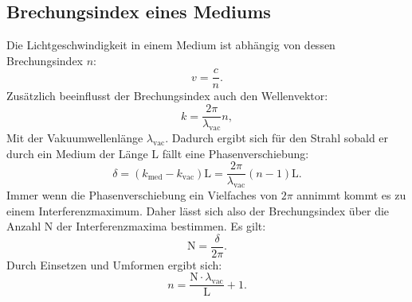 \documentclass[
  bibliography=totoc,     %
  captions=tableheading,  %
  titlepage=firstiscover, %
]{scrartcl}
\begin{document}
\subsection{Brechungsindex eines Mediums}
\label{sub:brechmedium}
Die Lichtgeschwindigkeit in einem Medium ist abhängig von dessen Brechungsindex $n$:
\begin{equation}
  v = \frac{c}{n}.
  \label{eqn:lichtmedium}
\end{equation}
Zusätzlich beeinflusst der Brechungsindex auch den Wellenvektor:
\begin{equation}
  k = \frac{2\pi}{\lambda_\mathup{vac}}n,
  \label{eqn:lichtmedium}
\end{equation}
Mit der Vakuumwellenlänge $\lambda_\mathup{vac}$.
Dadurch ergibt sich für den Strahl sobald er durch ein Medium der Länge $\mathup{L}$
fällt eine Phasenverschiebung:
\begin{equation}
  \delta = (k_\mathup{med}-k_\mathup{vac})\mathup{L} = \frac{2\pi}{\lambda_\mathup{vac}}(n-1)\mathup{L}.
  \label{eqn:phasen}
\end{equation}
Immer wenn die Phasenverschiebung ein Vielfaches von $2\pi$ annimmt kommt es zu
einem Interferenzmaximum. Daher lässt sich also der Brechungsindex über die
Anzahl $\mathup{N}$ der Interferenzmaxima bestimmen. Es gilt:
\begin{equation}
  \mathup{N} = \frac{\delta}{2\pi}.
  \label{eqn:anzahlmax}
\end{equation}
Durch Einsetzen und Umformen ergibt sich:
\begin{equation}
  n = \frac{\mathup{N}\cdot\lambda_\mathup{vac}}{\mathup{L}}+1.
  \label{eqn:brechgas}
\end{equation}
\end{document}
